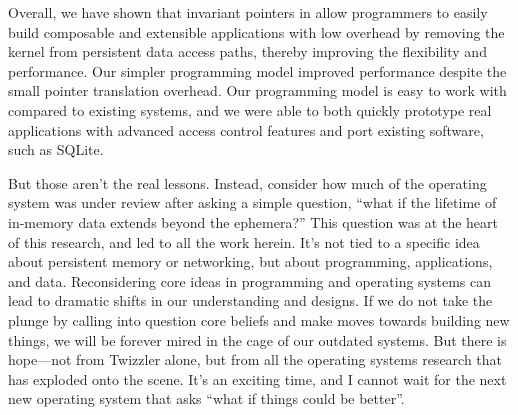 
Overall, we have shown that invariant pointers in \Twizzler allow programmers to easily build
composable and extensible applications with low overhead
by removing the kernel from persistent data access paths,
thereby improving the flexibility and performance.
Our simpler programming model improved performance despite the small
pointer translation overhead.
Our programming model is easy to work with
compared to existing systems, and we were able to both quickly prototype real
applications with advanced access control features and port existing software, such as SQLite.

But those aren't the real lessons. Instead, consider how much of the operating system was under review after asking a
simple question, ``what if the lifetime of in-memory data extends beyond the ephemera?'' This question was at the heart
of this research, and led to all the work herein. It's not tied to a specific idea about persistent
memory or networking, but about programming, applications, and
data. Reconsidering core ideas in programming and operating systems can lead to dramatic shifts in our understanding and
designs. If we do not take the plunge by calling into question core beliefs and make moves towards building new things,
we will be forever mired in the cage of our outdated systems. But there is hope---not from Twizzler alone, but from all
the operating systems research that has exploded onto the scene. It's an exciting time, and I cannot wait for the next
new operating system that asks ``what if things could be better''.

